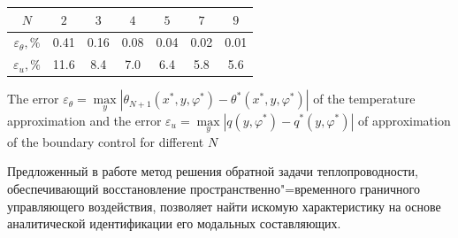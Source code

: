 \begin{table}[t!]

\small \centering



\renewcommand{\tabcolsep}{0.55cm}

\begin{tabular}{c||c|c|c|c|c|c}

\hline


\footnotesize $N$  & \footnotesize  $2$ & \footnotesize  $3$ & \footnotesize  $4$ & \footnotesize  $5$ & \footnotesize  $7$ & \footnotesize  $9 $ \\

            \hline

            \rule{0mm}{12pt}%

            \phantom{1} ${\varepsilon _\theta }, \%$ & 0.41 & 0.16 & 0.08 & 0.04 & 0.02  & 0.01 \\

             \phantom{1} ${\varepsilon _u}, \%$ & 11.6 & 8.4 & 7.0 & 6.4 & 5.8 & 5.6 \\

             \hline

        \end{tabular}

\footnotesize 



The error $\varepsilon _\theta  =  \max \limits_y | \theta _{N + 1}(x^*,y,\varphi ^*) - \theta ^*(x^*,y,\varphi ^*) |$ of the temperature approximation  and the error   ${\varepsilon _u} = \max \limits_y | q ( y,\varphi ^* ) - q^*(y,\varphi ^*) |$ of approximation of the boundary control for different $N$ 



\end{table} 





\smallskip









Предложенный в работе метод решения обратной задачи теплопроводности, обеспечивающий восстановление пространственно"=временного граничного управляющего воздействия, позволяет найти искомую характеристику на основе аналитической идентификации его модальных составляющих. 

